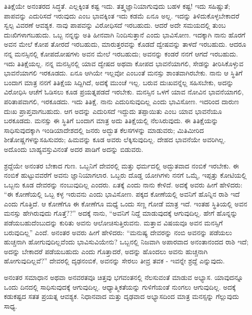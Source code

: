 ತಿತಿಕ್ಷೆಯೇ ಅನಂತರದ ಸಿದ್ಧತೆ. ಎಲ್ಲಕ್ಕಿಂತ ಕಷ್ಟ ಇದು. ತತ್ತ್ವಜ್ಞಾನಿಯಾಗುವುದು ಬಹಳ ಕಷ್ಟ! ಇದು ಸಹಿಷ್ಣುತೆ; ಪಾಪವನ್ನು ಎದುರಿಸದೆ ಇರುವುದು ಎಂಬ ಭಾವಕ್ಕಿಂತ ಇದು ಕಡಮೆ ಏನೂ ಅಲ್ಲ. ಇದನ್ನು ತಿಳಿದುಕೊಳ್ಳಬೇಕಾದರೆ ಸ್ವಲ್ಪ ವಿವರಣೆ ಆವಶ್ಯಕ. ನಾವು ಪಾಪವನ್ನು ವಿರೋಧಿಸದೆ ಇರಬಹುದು. ಆದರೆ ಅದೇ ಸಮಯದಲ್ಲಿ ತುಂಬ ದುಃಖಿಗಳಾಗಬಹುದು. ಒಬ್ಬ ನನ್ನನ್ನು ಅತಿ ಹೀನವಾಗಿ ನಿಂದಿಸುತ್ತಾನೆ ಎಂದು ಭಾವಿಸೋಣ. ಇದಕ್ಕಾಗಿ ನಾನು ಹೊರಗೆ ಅವನ ಮೇಲೆ ಕೋಪ ತೋರದೆ ಇರಬಹುದು, ಮಾರುತ್ತರವನ್ನು ಕೊಡದೆ ದ್ವೇಷವನ್ನು ತಾಳದೆ ಇರಬಹುದು. ಆದರೂ ನನ್ನ ಮನಸ್ಸಿನಲ್ಲಿ ಕೋಪದೋಷಗಳು ಅವನ ಮೇಲೆ ಇರಬಹುದು; ಅವನನ್ನು ಕಂಡರೆ ನನಗೆ ಆಗದೆ ಇರಬಹುದು. ಇದು ತಿತಿಕ್ಷೆಯಲ್ಲ. ನನ್ನ ಮನಸ್ಸಿನಲ್ಲಿ ಯಾವ ದ್ವೇಷದ ಅಥವಾ ಕೋಪದ ಭಾವನೆಯಾಗಲಿ, ಸೇಡನ್ನು ತೀರಿಸಿಕೊಳ್ಳುವ ಭಾವನೆಯಾಗಲಿ ಇರಕೂಡದು. ಏನೂ ಆಗಿಯೇ ಇಲ್ಲವೋ ಎಂಬಂತೆ ಮನಸ್ಸು ಶಾಂತವಾಗಿರಬೇಕು. ನಾನು ಆ ಸ್ಥಿತಿಗೆ ಬಂದಾಗ ಮಾತ್ರ ನನಗೆ ತಿತಿಕ್ಷೆಯ ಸಿದ್ದಿಗಿದೆ, ಅದಕ್ಕೆ ಮುಂಚೆ ಇಲ್ಲ. ಬರುವ ದುಃಖವನ್ನೆಲ್ಲ ಸಹಿಸಬೇಕು, ಅದನ್ನು ವಿರೋಧಿಸಿ ಆಚೆಗೆ ಓಡಿಸಲು ಕೂಡ ಪ್ರಯತ್ನಪಡದೆ ಇರಬೇಕು. ಮನಸ್ಸಿನ ಒಳಗೆ ಯಾವ ನೋವಿನ ಭಾವನೆಯಾಗಲಿ, ಪರಿತಾಪವಾಗಲಿ, ಇರಕೂಡದು. ಇದು ತಿತಿಕ್ಷೆ. ನಾನು ಎದುರಿಸುವುದಿಲ್ಲ ಎಂದು ಭಾವಿಸೋಣ. ಇದರಿಂದ ದಾರುಣ ದುಃಖ ಪ್ರಾಪ್ತವಾಗಬಹುದು. ಆಗ ಅದನ್ನು ಎದುರಿಸದೆ ಇದ್ದುದು ತಪ್ಪಾಯಿತು ಎಂಬ ಯಾವ ಭಾವನೆಯೂ ಬರಕೂಡದು. ಮನಸ್ಸು ಈ ಸ್ಥಿತಿಗೆ ಬಂದಾಗ ಮಾತ್ರ ಅದು ತಿತಿಕ್ಷೆಯಲ್ಲಿ ನೆಲಸಿರುವುದು. ಈ ತಿತಿಕ್ಷೆಯನ್ನು ಸಾಧಿಸುವುದಕ್ಕಾಗಿ ಇಂಡಿಯಾದೇಶದಲ್ಲಿ ಜನರು ಅದ್ಭುತ ಕೆಲಸಗಳನ್ನು ಮಾಡುವರು; ಮಿತಿಮೀರಿದ ಶೀತೋಷ್ಣಗಳನ್ನು\break ಸಹಿಸುವರು; ಹಿಮವನ್ನು ಕೂಡ ಅವರು ಲೆಕ್ಕಿಸುವುದಿಲ್ಲ. ದೇಹದ ಭಾವನೆಯೇ ಅವರಿಗಿಲ್ಲ. ಅದೊಂದು ಬಾಹ್ಯವಸ್ತುವಿನಂತೆ ಅದರ ಪಾಡಿಗೆ ಅದನ್ನು ಬಿಡುವರು.

ಶ್ರದ್ದೆಯೇ ಅನಂತರ ಬೇಕಾದ ಗುಣ. ಒಬ್ಬನಿಗೆ ದೇವರಲ್ಲಿ ಮತ್ತು ಧರ್ಮದಲ್ಲಿ ಅದ್ಭುತವಾದ ನಂಬಿಕೆ ಇರಬೇಕು. ಈ ನಂಬಿಕೆ ಹುಟ್ಟುವವರೆಗೆ ಅವನು ಜ್ಞಾನಿಯಾಗಲಾರ. ಒಬ್ಬರು ದೊಡ್ಡ ಯೋಗಿಗಳು ನನಗೆ ಒಮ್ಮೆ, ಇಪ್ಪತ್ತು ಕೋಟಿಯಲ್ಲಿ ಒಬ್ಬನು ಕೂಡ ದೇವರನ್ನು ನಂಬುವುದಿಲ್ಲ ಎಂದರು. ಏತಕ್ಕೆ ಎಂದು ನಾನು ಕೇಳಿದೆ. ಅದಕ್ಕೆ ಅವರು ಹೀಗೆ ಹೇಳಿದರು: “ಈ ಕೋಣೆಯಲ್ಲಿ ಒಬ್ಬ ಕಳ್ಳ ಇರುವನು ಎಂದು ಭಾವಿಸೋಣ. ಪಕ್ಕದ ಕೋಣೆಯಲ್ಲಿ ಅವನಿಗೆ ಹೊನ್ನಿನ ರಾಶಿ ಇದೆ ಎಂದು ಗೊತ್ತಿದೆ. ಆ ಕೋಣೆಗೂ ಈ ಕೋಣೆಗೂ ಮಧ್ಯೆ ಒಂದು ಸಣ್ಣ ಗೋಡೆ ಮಾತ್ರ ಇದೆ. ಇಂತಹ ಸ್ಥಿತಿಯಲ್ಲಿ ಅವನ ಮನಸ್ಸು ಹೇಗಿರುವುದು ಗೊತ್ತೆ??” ಅದಕ್ಕೆ ನಾನು, “ಅವನಿಗೆ ನಿದ್ದೆ ಮಾಡುವುದಕ್ಕೆ ಆಗುವುದಿಲ್ಲ. ಹೇಗೆ ಹೊನ್ನನ್ನು ಪಡೆಯಬಹುದೆಂಬುದನ್ನು ಕುರಿತು ಅವನು ಆಲೋಚಿಸುತ್ತಿರುವನು. ಮತ್ತಾವ ವಿಷಯವೂ ಅವನ ಮನಸ್ಸಿಗೆ ಬರುವುದಿಲ್ಲ” ಎಂದೆ. ಅನಂತರ ಅವರು ಹೀಗೆ ಹೇಳಿದರು: “ಮನುಷ್ಯ ದೇವರನ್ನು ನಂಬಿ ಅವನನ್ನು ಪಡೆಯಲು ಹುಚ್ಚನಾಗಿ ಹೋಗುವುದಿಲ್ಲವೆಂದು ಭಾವಿಸುವಿಯೇನು? ಒಬ್ಬನಲ್ಲಿ ನಿಜವಾಗಿ ಅಪಾರವಾದ ಅನಂತಾನಂದದ ರಾಶಿ ಇದೆ; ಅದನ್ನು ಬೇಕಾದರೆ ಪಡೆಯಬಹುದು ಎಂದು ಗೊತ್ತಾದರೆ, ಅದನ್ನು ಹೊಂದಲು ಅವನು ಹುಚ್ಚನಾಗಿ ಹೋಗುವುದಿಲ್ಲವೆ?'' ದೇವರಲ್ಲಿ ದೃಢನಂಬಿಕೆ, ಅವನನ್ನು ಸೇರಲು ತೀವ್ರ ತವಕ - ಇವನ್ನೇ ಶ್ರದ್ದೆ ಎನ್ನುವುದು.

ಅನಂತರ ಸಮಾಧಾನ ಅಥವಾ ಅನವರತವೂ ಚಿತ್ತವು ಭಗವಂತನಲ್ಲಿ ನೆಲಸುವಂತೆ ಮಾಡುವ ಅಭ್ಯಾಸ. ಯಾವುದನ್ನೂ ಒಂದು ದಿನದಲ್ಲಿ ಸಾಧಿಸುವುದಕ್ಕೆ ಆಗುವುದಿಲ್ಲ. ಆಧ್ಯಾತ್ಮಿಕತೆಯನ್ನು ಗುಳಿಗೆಯಂತೆ ನುಂಗಲು ಆಗುವುದಿಲ್ಲ. ಅದಕ್ಕೆ ಕಡುಕಷ್ಟದ ಸತತ ಪ್ರಯತ್ನ ಆವಶ್ಯಕ. ನಿಧಾನವಾದ ಮತ್ತು ದೃಢವಾದ ಅಭ್ಯಾಸದಿಂದ ಮಾತ್ರ ಮನಸ್ಸನ್ನು ಗೆಲ್ಲುವುದು ಸಾಧ್ಯ.

